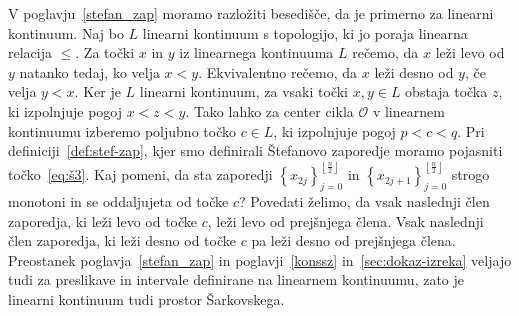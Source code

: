 \documentclass[../TG_magistrsko_delo_sections.tex]{subfiles}
\begin{document}
V poglavju~\ref{stefan_zap} moramo razložiti besedišče, da je primerno za linearni kontinuum. Naj bo $L$ linearni kontinuum s topologijo, ki jo poraja linearna relacija $\leq$. Za točki $x$ in $y$ iz linearnega kontinuuma $L$ rečemo, da $x$ leži levo od $y$ natanko tedaj, ko velja $x<y$. Ekvivalentno rečemo, da $x$ leži desno od $y$, če velja $y<x$. Ker je $L$ linearni kontinuum, za vsaki točki $x, y \in L$ obstaja točka $z$, ki izpolnjuje pogoj $x<z<y$. Tako lahko za center cikla $\mathcal{O}$ v linearnem kontinuumu izberemo poljubno točko $c \in L$, ki izpolnjuje pogoj $p< c <q$. Pri definiciji~\ref{def:stef-zap}, kjer smo definirali Štefanovo zaporedje moramo pojasniti točko~\ref{eq:š3}. Kaj pomeni, da sta zaporedji 
$\left \{ x_{2j} \right \}_{j=0}^{\left \lfloor \frac{n}{2} \right \rfloor}$ 
    in
$\left \{ x_{2j+1} \right \}_{j=0}^{\left \lfloor \frac{n}{2} \right \rfloor}$
 strogo monotoni in se oddaljujeta od točke $c$?
Povedati želimo, da vsak naslednji člen zaporedja, ki leži levo od točke $c$, leži levo od prejšnjega člena. Vsak naslednji člen zaporedja, ki leži desno od točke $c$ pa leži desno od prejšnjega člena. Preostanek poglavja~\ref{stefan_zap} in poglavji~\ref{konssz} in~\ref{sec:dokaz-izreka} veljajo tudi za preslikave in intervale definirane na linearnem kontinuumu, zato je linearni kontinuum tudi prostor Šarkovskega.
\end{document}
